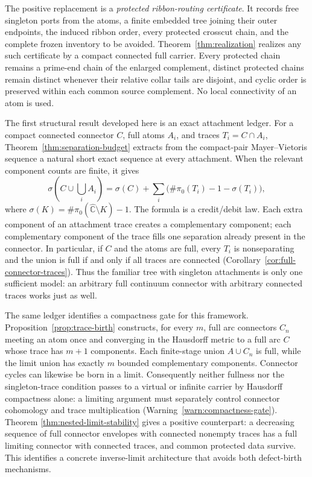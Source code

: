 \documentclass[11pt,reqno]{amsart}
\theoremstyle{definition}
\theoremstyle{remark}
\newcommand{\Chat}{\widehat{\mathbb C}}
\begin{document}
The positive replacement is a \emph{protected ribbon-routing certificate}.
It records free singleton ports from the atoms, a finite embedded tree
joining their outer endpoints, the induced ribbon order, every protected
crosscut chain, and the complete frozen inventory to be avoided.
Theorem~\ref{thm:realization} realizes any such certificate by a compact
connected full carrier.  Every protected chain remains a prime-end chain of
the enlarged complement, distinct protected chains remain distinct whenever
their relative collar tails are disjoint, and cyclic order is preserved
within each common source complement.  No local connectivity of an atom is
used.

The first structural result developed here is an exact attachment ledger.
For a compact connected connector $C$, full atoms $A_i$, and traces
$T_i=C\cap A_i$, Theorem~\ref{thm:separation-budget} extracts from the
compact-pair Mayer--Vietoris sequence a natural short exact sequence at
every attachment.  When the relevant component counts are finite, it gives
\[
 \sigma\!\left(C\cup\bigcup_iA_i\right)
 =
 \sigma(C)+
 \sum_i\bigl(\#\pi_0(T_i)-1-\sigma(T_i)\bigr),
\]
where $\sigma(K)=\#\pi_0(\Chat\setminus K)-1$.  The formula is a
credit/debit law.  Each extra component of an attachment trace creates a
complementary component; each complementary component of the trace fills
one separation already present in the connector.  In particular, if $C$
and the atoms are full, every $T_i$ is nonseparating and the union is full
if and only if all traces are connected
(Corollary~\ref{cor:full-connector-traces}).  Thus the familiar tree with
singleton attachments is only one sufficient model: an arbitrary full
continuum connector with arbitrary connected traces works just as well.

The same ledger identifies a compactness gate for this framework.
Proposition~\ref{prop:trace-birth} constructs, for every $m$, full arc
connectors $C_n$ meeting an atom once and converging in the Hausdorff metric
to a full arc $C$ whose trace has $m+1$ components.  Each finite-stage
union $A\cup C_n$ is full, while the
limit union has exactly $m$ bounded complementary components.
Connector cycles can likewise be born in a limit.  Consequently neither
fullness nor the singleton-trace condition passes to a virtual or infinite
carrier by Hausdorff compactness alone: a limiting argument must separately
control connector cohomology and trace multiplication
(Warning~\ref{warn:compactness-gate}).  Theorem
\ref{thm:nested-limit-stability} gives a positive counterpart: a decreasing
sequence of full connector envelopes with connected nonempty traces has a
full limiting connector with connected traces, and common protected data
survive.  This identifies a concrete inverse-limit architecture that avoids
both defect-birth mechanisms.
\end{document}
